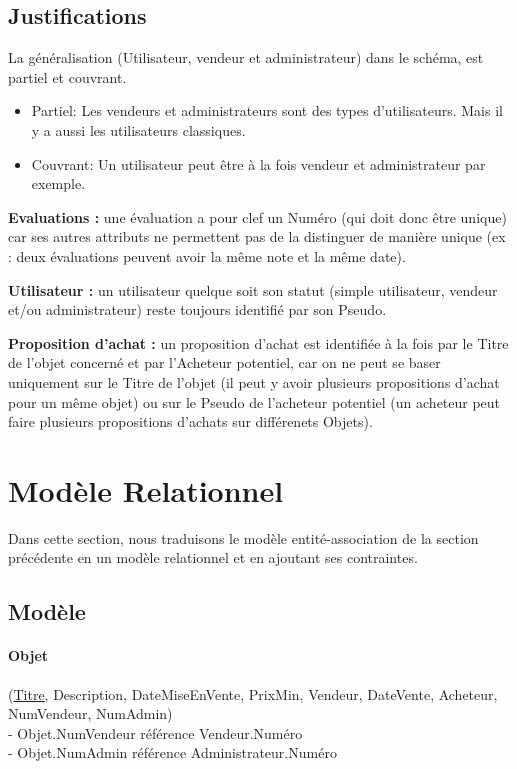 \documentclass[a4paper,11pt]{article}
\begin{document}
\newpage

\subsection{Justifications}
La généralisation (Utilisateur, vendeur et administrateur) dans le schéma, est partiel et couvrant.
\begin{itemize}
\item Partiel: Les vendeurs et administrateurs sont des types d'utilisateurs. Mais il y a aussi les utilisateurs classiques.
\item Couvrant: Un utilisateur peut être à la fois vendeur et administrateur par exemple.
\end{itemize}

\textbf{Evaluations :} une évaluation a pour clef un Numéro (qui doit donc être unique) car ses autres attributs ne permettent pas de la
	      distinguer de manière unique (ex : deux évaluations peuvent avoir la même note et la même date).

\textbf{Utilisateur :} un utilisateur quelque soit son statut (simple utilisateur, vendeur et/ou administrateur) reste toujours identifié
par son Pseudo.

\textbf{Proposition d'achat :} un proposition d'achat est identifiée à la fois par le Titre de l'objet concerné et par l'Acheteur potentiel,
car on ne peut se baser uniquement sur le Titre de l'objet (il peut y avoir plusieurs propositions d'achat pour un même objet)
ou sur le Pseudo de l'acheteur potentiel (un acheteur peut faire plusieurs propositions d'achats sur différenets Objets).

\section{Modèle Relationnel}
Dans cette section, nous traduisons le modèle entité-association de la section précédente en un modèle relationnel et en ajoutant ses contraintes.

\subsection{Modèle}

\indent

\paragraph{Objet} (\underline{Titre}, Description, DateMiseEnVente, PrixMin, Vendeur, DateVente, Acheteur, NumVendeur, NumAdmin)\\
\indent - Objet.NumVendeur référence Vendeur.Numéro\\
\indent - Objet.NumAdmin référence Administrateur.Numéro
\end{document}
